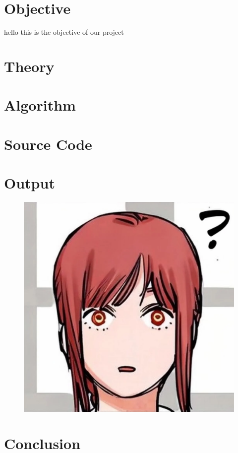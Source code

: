 \documentclass[19pt]{article}
\title{}
\date{}
\author{}
\begin{document}
	\maketitle
	\vspace{-2cm}

	\section{Objective}
	hello this is the objective of our project


	\section{Theory}

	\section{Algorithm}

	\section{Source Code}
	
	\newpage
	\section{Output}

	\begin{figure}[!h]
		\hspace*{-1cm}
		\centering
		\includegraphics[width=1.01\linewidth]{outputx.png}
		\caption{}
		\label{fig:}
	\end{figure}

	\section{Conclusion}
\end{document}

